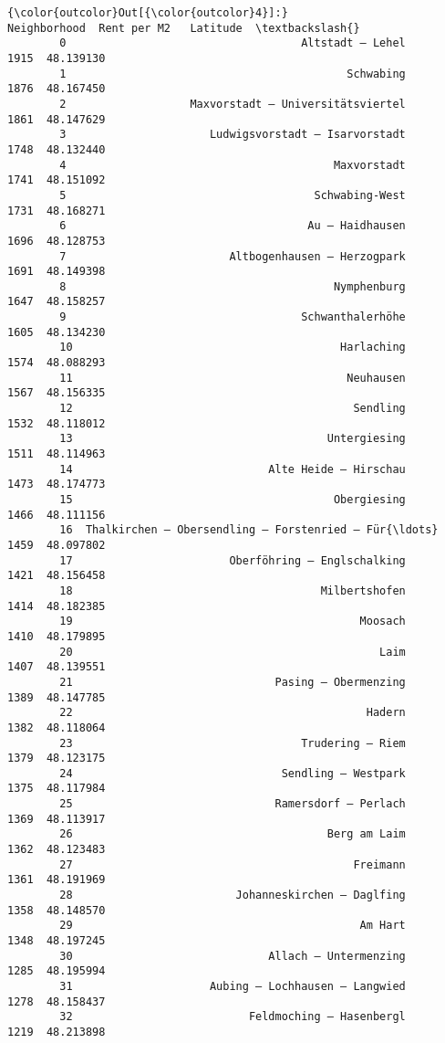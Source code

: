 \documentclass[11pt]{article}
\begin{document}
\begin{Verbatim}[commandchars=\\\{\}]
{\color{outcolor}Out[{\color{outcolor}4}]:}                                          Neighborhood  Rent per M2   Latitude  \textbackslash{}
        0                                    Altstadt – Lehel         1915  48.139130   
        1                                           Schwabing         1876  48.167450   
        2                   Maxvorstadt – Universitätsviertel         1861  48.147629   
        3                      Ludwigsvorstadt – Isarvorstadt         1748  48.132440   
        4                                         Maxvorstadt         1741  48.151092   
        5                                      Schwabing-West         1731  48.168271   
        6                                     Au – Haidhausen         1696  48.128753   
        7                         Altbogenhausen – Herzogpark         1691  48.149398   
        8                                         Nymphenburg         1647  48.158257   
        9                                    Schwanthalerhöhe         1605  48.134230   
        10                                         Harlaching         1574  48.088293   
        11                                          Neuhausen         1567  48.156335   
        12                                           Sendling         1532  48.118012   
        13                                       Untergiesing         1511  48.114963   
        14                              Alte Heide – Hirschau         1473  48.174773   
        15                                        Obergiesing         1466  48.111156   
        16  Thalkirchen – Obersendling – Forstenried – Für{\ldots}         1459  48.097802   
        17                        Oberföhring – Englschalking         1421  48.156458   
        18                                      Milbertshofen         1414  48.182385   
        19                                            Moosach         1410  48.179895   
        20                                               Laim         1407  48.139551   
        21                               Pasing – Obermenzing         1389  48.147785   
        22                                             Hadern         1382  48.118064   
        23                                   Trudering – Riem         1379  48.123175   
        24                                Sendling – Westpark         1375  48.117984   
        25                               Ramersdorf – Perlach         1369  48.113917   
        26                                       Berg am Laim         1362  48.123483   
        27                                           Freimann         1361  48.191969   
        28                         Johanneskirchen – Daglfing         1358  48.148570   
        29                                            Am Hart         1348  48.197245   
        30                              Allach – Untermenzing         1285  48.195994   
        31                     Aubing – Lochhausen – Langwied         1278  48.158437   
        32                           Feldmoching – Hasenbergl         1219  48.213898   
        

\end{Verbatim}
\end{document}
